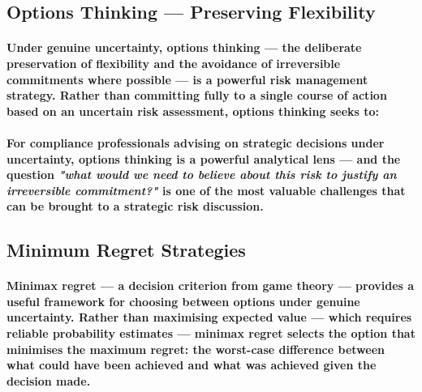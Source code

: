 \subsection{Options Thinking — Preserving Flexibility}
\paragraph{Under genuine uncertainty, options thinking — the deliberate preservation of flexibility and the avoidance of irreversible commitments where possible — is a powerful risk management strategy. Rather than committing fully to a single course of action based on an uncertain risk assessment, options thinking seeks to:}
\begin{itemize}
\end{itemize}
\paragraph{For compliance professionals advising on strategic decisions under uncertainty, options thinking is a powerful analytical lens — and the question \textit{"what would we need to believe about this risk to justify an irreversible commitment?"} is one of the most valuable challenges that can be brought to a strategic risk discussion.}

\subsection{Minimum Regret Strategies}
\paragraph{\textbf{Minimax regret} — a decision criterion from game theory — provides a useful framework for choosing between options under genuine uncertainty. Rather than maximising expected value — which requires reliable probability estimates — minimax regret selects the option that minimises the maximum regret: the worst-case difference between what could have been achieved and what was achieved given the decision made.}
